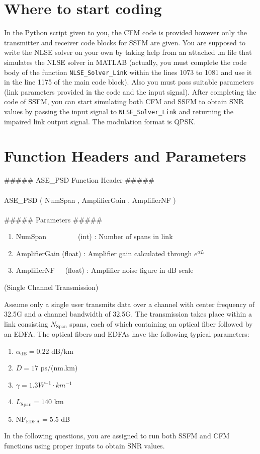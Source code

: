 \documentclass[10pt,letterpaper]{article}
\newcommand{\Span}{\text{Span}}
\newcommand{\NF}{\text{NF}}
\newcommand{\EDFA}{\text{EDFA}}
\newcommand{\ASE}{\text{ASE}}
\newcommand{\nl}{\newline\newline}
\begin{document}
\section{Where to start coding}
In the Python script given to you, the CFM code is provided however only the transmitter and receiver code blocks for SSFM are given. You are supposed to write the NLSE solver on your own by taking help from an attached .m file that simulates the NLSE solver in MATLAB (actually, you must complete the code body of the function \texttt{NLSE\_Solver\_Link} within the lines 1073 to 1081 and use it in the line 1175 of the main code block). Also you must pass suitable parameters (link parameters provided in the code and the input signal). After completing the code of SSFM, you can start simulating both CFM and SSFM to obtain SNR values by passing the input signal to \texttt{NLSE\_Solver\_Link} and returning the impaired link output signal. The modulation format is QPSK.
\section{Function Headers and Parameters}
\#\#\#\#\# ASE\_PSD Function Header \#\#\#\#\#
\\
\\ASE\_PSD ( NumSpan , AmplifierGain , AmplifierNF )
\\
\\
\#\#\#\#\# Parameters \#\#\#\#\#
\begin{enumerate}
\item
NumSpan\ \ \ \ \ \ \ \ \ (int) : Number of spans in link
\item
AmplifierGain (float) : Amplifier gain calculated through $e^{\alpha L}$
\item
AmplifierNF\ \ \  (float) : Amplifier noise figure in dB scale
\end{enumerate}
(Single Channel Transmission)

Assume only a single user transmits data over a channel with center frequency of 32.5G and a channel bandwidth of 32.5G. The transmission takes place within a link consisting $N_{\Span}$ spans, each of which containing an optical fiber followed by an EDFA. The optical fibers and EDFAs have the following typical parameters:
\begin{enumerate}
\item
$\alpha_{\text{dB}}=0.22 $ dB/km
\item
$D=17$ ps/(nm.km)
\item
$\gamma=1.3 W^{-1}\cdot km^{-1}$
\item
$L_\Span=140$ km
\item
$\NF_{\EDFA}=5.5$ dB
\end{enumerate}
In the following questions, you are assigned to run both SSFM and CFM functions using proper inputs to obtain SNR values. 
\end{document}

